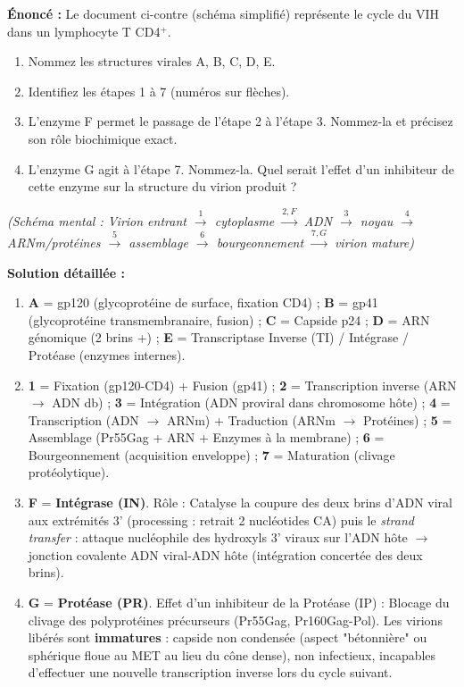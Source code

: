 \documentclass[11pt]{article}
\begin{document}
\begin{exoresolu}
\textbf{Énoncé :} Le document ci-contre (schéma simplifié) représente le cycle du VIH dans un lymphocyte T CD4$^+$. 
\begin{enumerate}
    \item Nommez les structures virales A, B, C, D, E.
    \item Identifiez les étapes 1 à 7 (numéros sur flèches).
    \item L'enzyme F permet le passage de l'étape 2 à l'étape 3. Nommez-la et précisez son rôle biochimique exact.
    \item L'enzyme G agit à l'étape 7. Nommez-la. Quel serait l'effet d'un inhibiteur de cette enzyme sur la structure du virion produit ?
\end{enumerate}
\textit{(Schéma mental : Virion entrant $\xrightarrow{1}$ cytoplasme $\xrightarrow{2, F}$ ADN $\xrightarrow{3}$ noyau $\xrightarrow{4}$ ARNm/protéines $\xrightarrow{5}$ assemblage $\xrightarrow{6}$ bourgeonnement $\xrightarrow{7, G}$ virion mature)}

\tcblower
\textbf{Solution détaillée :}
\begin{enumerate}
    \item \textbf{A} = gp120 (glycoprotéine de surface, fixation CD4) ; \textbf{B} = gp41 (glycoprotéine transmembranaire, fusion) ; \textbf{C} = Capside p24 ; \textbf{D} = ARN génomique (2 brins +) ; \textbf{E} = Transcriptase Inverse (TI) / Intégrase / Protéase (enzymes internes).
    \item \textbf{1} = Fixation (gp120-CD4) + Fusion (gp41) ; \textbf{2} = Transcription inverse (ARN $\to$ ADN db) ; \textbf{3} = Intégration (ADN proviral dans chromosome hôte) ; \textbf{4} = Transcription (ADN $\to$ ARNm) + Traduction (ARNm $\to$ Protéines) ; \textbf{5} = Assemblage (Pr55Gag + ARN + Enzymes à la membrane) ; \textbf{6} = Bourgeonnement (acquisition enveloppe) ; \textbf{7} = Maturation (clivage protéolytique).
    \item \textbf{F} = \textbf{Intégrase (IN)}. Rôle : Catalyse la coupure des deux brins d'ADN viral aux extrémités 3' (processing : retrait 2 nucléotides CA) puis le \emph{strand transfer} : attaque nucléophile des hydroxyls 3' viraux sur l'ADN hôte $\to$ jonction covalente ADN viral-ADN hôte (intégration concertée des deux brins).
    \item \textbf{G} = \textbf{Protéase (PR)}. Effet d'un inhibiteur de la Protéase (IP) : Blocage du clivage des polyprotéines précurseurs (Pr55Gag, Pr160Gag-Pol). Les virions libérés sont \textbf{immatures} : capside non condensée (aspect "bétonnière" ou sphérique floue au MET au lieu du cône dense), non infectieux, incapables d'effectuer une nouvelle transcription inverse lors du cycle suivant.
\end{enumerate}
\end{exoresolu}
\end{document}
